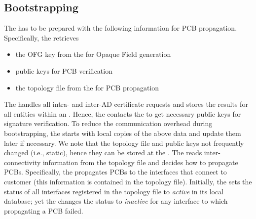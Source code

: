 \subsection{Bootstrapping}
The \BS has to be prepared with the following information for PCB propagation.
Specifically, the \BS retrieves 
\begin{itemize}
\item the OFG key from the \CS for Opaque Field generation 
\item \AD public keys for PCB verification
\item the topology file from the \CS for PCB propagation
\end{itemize}
The \CS handles all intra- and inter-AD certificate requests and stores the results for all entities within an \AD. Hence, the \BS contacts the \CS to get necessary \AD public keys for signature verification. To reduce the communication overhead during bootstrapping, the \BS starts with local copies of the above data and update them later if necessary. We note that the topology file and \AD public keys not frequently changed (i.e., static), hence they can be stored at the \BS. The \BS reads inter-\AD connectivity information from the topology file and decides how to propagate PCBs. Specifically, the \BS propagates PCBs to the interfaces that connect to customer \ADs (this information is contained in the topology file). Initially, the \BS sets the status of all interfaces registered in the topology file to {\em active} in its local database; yet the \BS changes the status to {\em inactive} for any interface to which propagating a PCB failed. 

